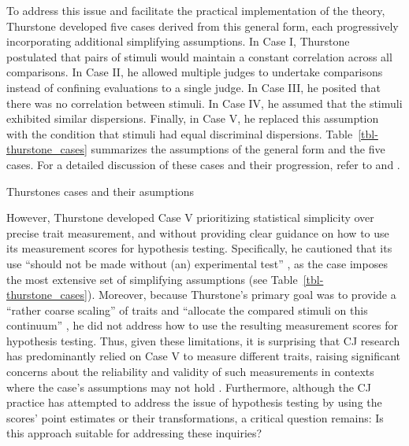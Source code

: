 \documentclass[
  authoryear,
  review,
  1p]{elsarticle}
\begin{document}
To address this issue and facilitate the practical implementation of the
theory, Thurstone developed five cases derived from this general form,
each progressively incorporating additional simplifying assumptions. In
Case I, Thurstone postulated that pairs of stimuli would maintain a
constant correlation across all comparisons. In Case II, he allowed
multiple judges to undertake comparisons instead of confining
evaluations to a single judge. In Case III, he posited that there was no
correlation between stimuli. In Case IV, he assumed that the stimuli
exhibited similar dispersions. Finally, in Case V, he replaced this
assumption with the condition that stimuli had equal discriminal
dispersions. Table~\ref{tbl-thurstone_cases} summarizes the assumptions
of the general form and the five cases. For a detailed discussion of
these cases and their progression, refer to \citet{Thurstone_1927b} and
\citet[pp.~248--253]{Bramley_2008}.

\begin{table}

\caption{\label{tbl-thurstone_cases}Thurstones cases and their
asumptions}


\end{table}%

However, Thurstone developed Case V prioritizing statistical simplicity
over precise trait measurement, and without providing clear guidance on
how to use its measurement scores for hypothesis testing. Specifically,
he cautioned that its use ``should not be made without (an) experimental
test'' \citep[pp.~270]{Thurstone_1927b}, as the case imposes the most
extensive set of simplifying assumptions
\citetext{\citealp[pp.~253]{Bramley_2008}; \citealp[pp.~677]{Kelly_et_al_2022}}
(see Table~\ref{tbl-thurstone_cases}). Moreover, because Thurstone's
primary goal was to provide a ``rather coarse scaling'' of traits
\citep[pp.~269]{Thurstone_1927b} and ``allocate the compared stimuli on
this continuum'' \citep[pp.~269]{Thurstone_1927b}, he did not address
how to use the resulting measurement scores for hypothesis testing.
Thus, given these limitations, it is surprising that CJ research has
predominantly relied on Case V to measure different traits, raising
significant concerns about the reliability and validity of such
measurements in contexts where the case's assumptions may not hold
\citep[pp.~677]{Kelly_et_al_2022}. Furthermore, although the CJ practice
has attempted to address the issue of hypothesis testing by using the
scores' point estimates or their transformations, a critical question
remains: Is this approach suitable for addressing these inquiries?
\end{document}
